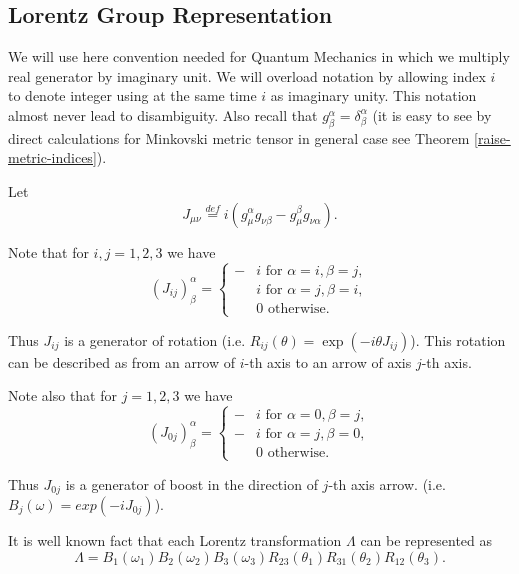 \documentclass[main.tex]{subfiles}
\begin{document}
\subsection{Lorentz Group Representation}

We will use here convention needed for Quantum Mechanics in which we multiply real generator by imaginary unit. We will overload notation by allowing index $i$ to denote integer using at the same time $i$ as imaginary unity. This notation almost never lead to disambiguity. Also recall that $g^\alpha_\beta = \delta^\alpha_\beta$ (it is easy to see by direct calculations for Minkovski metric tensor in general case see Theorem \ref{raise-metric-indices}).

Let
\begin{equation}
J_{\mu\nu} \stackrel{def}{=} i(g^\alpha_\mu g_{\nu\beta} - g^\beta_\mu g_{\nu\alpha}). 
\end{equation}

Note that for $i,j = 1,2,3$ we have
\begin{equation}
(J_{ij})^\alpha_\beta = 
\begin{cases}
-&i \text{ for } \alpha = i, \beta = j,\\
&i \text{ for } \alpha = j, \beta = i,\\
&0 \text{ otherwise. }
\end{cases}
\end{equation}

Thus $J_{ij}$ is a generator of rotation (i.e. $R_{ij}(\theta) = \exp(-i\theta J_{ij})$). This rotation can be described as from an arrow of $i$-th axis to an arrow of axis $j$-th axis.

Note also that for $j = 1,2,3$ we have
\begin{equation}
(J_{0j})^\alpha_\beta = 
\begin{cases}
- &i \text{ for } \alpha = 0, \beta = j,\\
- &i \text{ for } \alpha = j, \beta = 0,\\
&0 \text{ otherwise. }
\end{cases}
\end{equation}

Thus $J_{0j}$ is a generator of boost in the direction of $j$-th axis arrow. (i.e. $B_j(\omega) = exp(-iJ_{0j})$).

It is well known fact that each Lorentz transformation $\Lambda$ can be represented as
\begin{equation}
\Lambda = B_1(\omega_1)B_2(\omega_2)B_3(\omega_3)R_{23}(\theta_1)R_{31}(\theta_2)R_{12}(\theta_3).
\end{equation}
\end{document}
